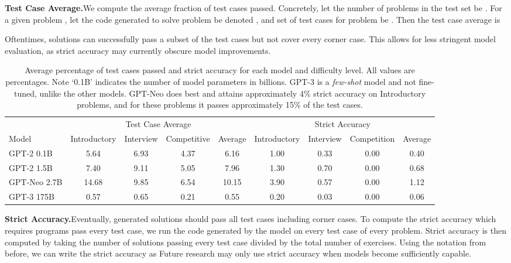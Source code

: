 \documentclass{article}
\begin{document}
\textbf{Test Case Average.}\quad We compute the average fraction of test cases passed. 
Concretely, let the number of problems in the test set be . For a given problem , let the code generated to solve problem  be denoted , and set of test cases for problem  be . Then the test case average is 


Oftentimes, solutions can successfully pass a subset of the test cases but not cover every corner case. This allows for less stringent model evaluation, as strict accuracy may currently obscure model improvements.

\begin{table*}[t]
\setlength{\tabcolsep}{2pt}
\small
\centering
\begin{tabular}{lcccc|cccc}
\multicolumn{1}{l}{} &  \multicolumn{4}{c}{Test Case Average} & \multicolumn{4}{c}{Strict Accuracy} \\
Model       & Introductory & Interview & Competitive &  Average & Introductory & Interview & Competition &  Average \\

\toprule
GPT-2 0.1B          & 5.64 & 6.93 & 4.37 & 6.16 & 1.00 & 0.33 & 0.00 & 0.40 \\
GPT-2 1.5B          & 7.40 & 9.11 & 5.05 & 7.96 & 1.30 & 0.70 & 0.00 & 0.68 \\
GPT-Neo 2.7B        & 14.68 & 9.85 & 6.54 & 10.15 & 3.90 & 0.57 & 0.00 & 1.12 \\
GPT-3 175B        & 0.57 & 0.65 & 0.21 & 0.55 & 0.20 & 0.03 & 0.00 & 0.06 \\
\end{tabular}
\caption{Average percentage of test cases passed and strict accuracy for each model and difficulty level. All values are percentages. Note `0.1B' indicates the number of model parameters in billions. GPT-3 is a \emph{few-shot} model and not fine-tuned, unlike the other models. GPT-Neo does best and attains approximately 4\% strict accuracy on Introductory problems, and for these problems it passes approximately 15\% of the test cases.}
\label{tab:results}
\end{table*}

\textbf{Strict Accuracy.}\quad Eventually, generated solutions should pass all test cases including corner cases.
To compute the strict accuracy which requires programs pass every test case, we run the code generated by the model on every test case of every problem. Strict accuracy is then computed by taking the number of solutions passing every test case divided by the total number of exercises. Using the notation from before, we can write the strict accuracy as  Future research may only use strict accuracy when models become sufficiently capable.
\end{document}
